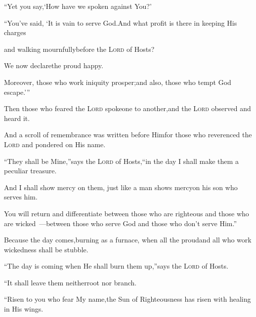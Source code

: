 \begin{inparaenum}
  \pb ``Yet you say,\pa `How have we spoken against You?'%
  
  \pa {} ``You've said, `It is vain to serve God.\pa And what profit is there in keeping His charges%
  
  \pb and walking mournfully\pa before the \textsc{Lord} of Hosts?%
  
  \pa {} We now declare\pa the proud happy.%
  
  \pb Moreover, those who work iniquity prosper;\pa and also, those who tempt God escape.'\thinspace''%
  
  \pa {} Then those who feared the \textsc{Lord} spoke\pa one to another,\pa and the \textsc{Lord} observed and heard it.%
  
  \pb And a scroll of remembrance was written before Him\pa for those who reverenced the \textsc{Lord} and pondered on His name.%
  
  \pa {} ``They shall be Mine,''\pa says the \textsc{Lord} of Hosts,\pa ``in the day I shall make them a peculiar treasure.%
  
  \pb And I shall show mercy on them, just like a man shows mercy\pa on his son who serves him.%
  
  \pa {} You will return and differentiate between those who are righteous and those who are wicked~---\pa between those who serve God and those who don't serve Him.''%
  
  \pa {}%
  Because the day comes,\pa burning as a furnace,%
  \pa when all the proud\pa and all who work wickedness shall be stubble.%
  
  \pb ``The day is coming when He shall burn them up,''\pa says the \textsc{Lord} of Hosts.%
  
  \pb ``It shall leave them neither\pa root nor branch.%
  
  \pa {} ``Risen to you who fear My name,\pa the Sun%
  of Righteousness has risen with healing in His wings.%
  

\end{inparaenum}
